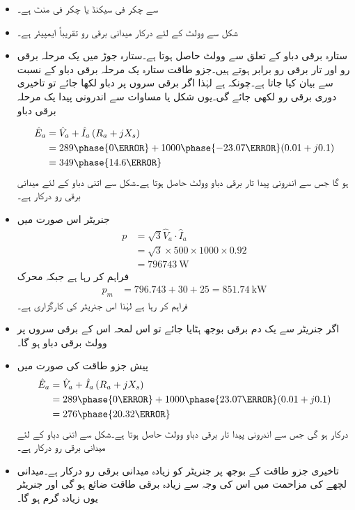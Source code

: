 \begin{itemize}
\item
{} سے  چکر فی سیکنڈ یا  چکر فی منٹ ہے۔
\item
شکل   سے    وولٹ کے لئے درکار میدانی برقی رو تقریباً  ایمپیئر ہے۔
\item
ستارہ برقی دباو کے تعلق  سے   وولٹ حاصل ہوتا ہے۔ستارہ جوڑ میں یک مرحلہ برقی رو اور تار برقی رو برابر ہوتے ہیں۔جزو طاقت ستارہ یک مرحلہ برقی دباو کے نسبت سے بیان کیا جاتا ہے۔چونکہ  ہے لہٰذا اگر برقی سروں پر دباو  لکھا جائے تو تاخیری دوری برقی رو   لکھی جائے گی۔یوں شکل  یا مساوات  سے اندرونی پیدا یک مرحلہ برقی دباو

\begin{align*}
\hat{E}_a&=\hat{V}_{a}+\hat{I}_a \left(R_a+j X_s \right)\\
&= 289\phase{0 \degree}+1000 \phase {-23.07 \degree} ( 0.01 +j 0.1)\\
&=349\phase{14.6 \degree}
\end{align*}
ہو گا جس سے اندرونی پیدا تار برقی دباو  وولٹ حاصل ہوتا ہے۔شکل  سے اتنی دباو کے لئے   میدانی برقی رو درکار ہے۔
\item
جنریٹر اس صورت میں
\begin{align*}
p&=\sqrt{3} \hat{V}_{a} \cdot \hat{I}_a\\
&=\sqrt{3} \times 500 \times 1000 \times 0.92\\
&=\SI{796743}{\watt}
\end{align*}
فراہم کر رہا ہے جبکہ محرک 
\begin{align*}
p_m&=796.743+30+25=\SI{851.74}{\kilo \watt}
\end{align*}
فراہم کر رہا ہے لہٰذا اس جنریٹر کی کارگزاری  ہے۔
\item
اگر جنریٹر سے یک دم برقی بوجھ ہٹایا جائے تو اس لمحہ اس کے برقی سروں پر   وولٹ برقی دباو ہو گا۔
\item
پیش جزو طاقت کی صورت میں
\begin{align*}
\hat{E}_a&=\hat{V}_{a}+\hat{I}_a \left(R_a+j X_s \right)\\
&= 289\phase{0 \degree}+1000 \phase {23.07 \degree} ( 0.01 +j 0.1)\\
&=276\phase{20.32 \degree}
\end{align*}
درکار ہو گی جس سے اندرونی پیدا تار برقی دباو  وولٹ حاصل ہوتا ہے۔شکل  سے اتنی دباو کے لئے   میدانی برقی رو درکار ہے۔
\item
تاخیری جزو طاقت کے بوجھ پر جنریٹر کو زیادہ میدانی برقی رو درکار ہے۔میدانی لچھے کی مزاحمت میں اس کی وجہ سے زیادہ برقی طاقت ضائع ہو گی اور جنریٹر یوں زیادہ گرم ہو گا۔
\end{itemize}
